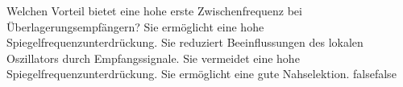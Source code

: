    {Welchen Vorteil bietet eine hohe erste Zwischenfrequenz bei Überlagerungsempfängern?}
    {Sie ermöglicht eine hohe Spiegelfrequenzunterdrückung.}
    {Sie reduziert Beeinflussungen des lokalen Oszillators durch Empfangssignale.}
    {Sie vermeidet eine hohe Spiegelfrequenzunterdrückung.}
    {Sie ermöglicht eine gute Nahselektion. }
    {false}{false}